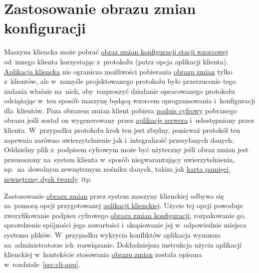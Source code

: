 \documentclass[thesis]{subfiles}
\begin{document}

\section{Zastosowanie obrazu zmian konfiguracji}
\label{sec:zastosowanie-obrazu-konfiguracji}

Maszyna kliencka może pobrać \hyperref[sec:obraz-zmian-konfiguracji]{obraz zmian konfiguracji stacji wzorcowej} od~innego klienta korzystając z~protokołu \sftp{} (patrz opcja  aplikacji klienta). \hyperref[sec:cli-app]{Aplikacja kliencka} nie ogranicza możliwości pobierania \hyperref[sec:obraz-zmian-konfiguracji]{obrazu zmian} tylko z~klientów, ale w~zamyśle projektowanego protokołu było przerzucenie tego zadania właśnie na~nich, aby~rozproszyć działanie opracowanego protokołu odciążając w~ten sposób maszynę będącą wzorcem oprogramowania i~konfiguracji dla~klientów. Poza obrazem zmian klient pobiera \href{https://superuser.com/a/426345/139893}{podpis cyfrowy} pobranego obrazu jeśli został on wygenerowany przez \hyperref[sec:srv-app]{aplikację serwera} i~udostępniony przez klienta. W~przypadku protokołu \sftp{} krok ten jest zbędny, ponieważ protokół ten zapewnia zarówno uwierzytelnienie jak i~integralność przesyłanych danych. Oddzielny plik z~podpisem cyfrowym może być użyteczny jeśli obraz zmian jest przenoszony na~system klienta w~sposób niegwarantujący uwierzytelnienia, np.~na~dowolnym zewnętrznym nośniku danych, takim jak \href{https://en.wikipedia.org/wiki/Memory_card}{karta pamięci}, \href{https://en.wikipedia.org/wiki/Hard_disk_drive\#External_hard_disk_drives}{zewnętrzny dysk twardy}~itp.

Zastosowanie \hyperref[sec:obraz-zmian-konfiguracji]{obrazu zmian} przez system maszyny klienckiej odbywa się za~pomocą opcji  przygotowanej \hyperref[sec:cli-app]{aplikacji klienckiej}. Użycie tej opcji powoduje zweryfikowanie podpisu cyfrowego \hyperref[sec:obraz-zmian-konfiguracji]{obrazu zmian konfiguracji}, rozpakowanie go, sprawdzenie spójności jego zawartości i~skopiowanie jej w~odpowiednie miejsca systemu plików. W~przypadku wykrycia konfliktów aplikacja wymusza na~administratorze ich~rozwiązanie. Dokładniejsza instrukcja użycia aplikacji klienckiej w~kontekście stosowania \hyperref[sec:obraz-zmian-konfiguracji]{obrazu zmian} została opisana w~rozdziale~\ref{sec:cli-app}.

\end{document}
